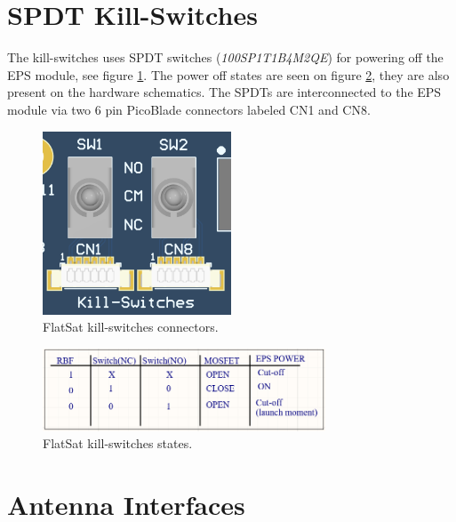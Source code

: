 \section {SPDT Kill-Switches}

The kill-switches uses SPDT switches (\textit{100SP1T1B4M2QE}) for powering off the EPS module, see figure \ref{fig:kill-switches-connectors}. The power off states are seen on figure \ref{fig:kill-switches-states}, they are also present on the hardware schematics. The SPDTs are interconnected to the EPS module via two 6 pin PicoBlade connectors labeled CN1 and CN8.

\begin{figure}[!ht]
    \begin{center}
        \includegraphics[width=0.5\textwidth]{figures/kill_switches_connectors.png}
        \caption{FlatSat kill-switches connectors.}
        \label{fig:kill-switches-connectors}
    \end{center}
\end{figure}

\begin{figure}[!ht]
    \begin{center}
        \includegraphics[width=0.75\textwidth]{figures/kill_switches_states.png}
        \caption{FlatSat kill-switches states.}
        \label{fig:kill-switches-states}
    \end{center}
\end{figure}

\section{Antenna Interfaces}

